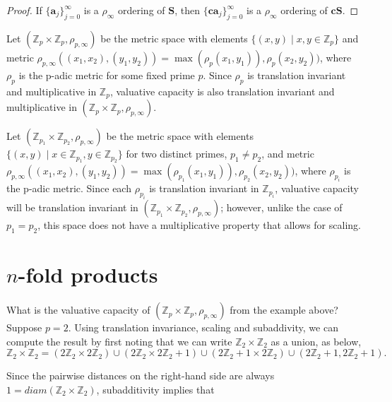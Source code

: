 \begin{proof}
If $\{\textbf{a}_j\}_{j=0}^\infty$ is a $\rho_\infty$ ordering of $\textbf{S}$, then $\{\textbf{ca}_j\}_{j=0}^\infty$ is a $\rho_\infty$ ordering of $\textbf{cS}$.
\end{proof}


\begin{example}
	Let $(\mathbb{Z}_p \times \mathbb{Z}_p, \rho_{p,\infty})$ be the metric space with elements $\{(x,y)\mid x,y \in \mathbb{Z}_p\}$ and metric $\rho_{p,\infty}((x_1,x_2), (y_1,y_2)) = \max(\rho_p(x_1, y_1)), \rho_p(x_2, y_2))$, where $\rho_p$ is the p-adic metric for some fixed prime $p$. Since $\rho_p$ is translation invariant and multiplicative in $\mathbb{Z}_p$, valuative capacity is also translation invariant and multiplicative in  $(\mathbb{Z}_p \times \mathbb{Z}_p, \rho_{p,\infty})$.
\end{example}

\begin{example}
	Let $(\mathbb{Z}_{p_1} \times \mathbb{Z}_{p_2}, \rho_{p,\infty})$ be the metric space with elements $\{(x,y)\mid x \in \mathbb{Z}_{p_1}, y \in \mathbb{Z}_{p_2}\}$ for two distinct primes, $p_1 \neq p_2$, and metric $\rho_{p,\infty}((x_1,x_2), (y_1,y_2)) = \max(\rho_{p_1}(x_1, y_1)), \rho_{p_2}(x_2, y_2))$, where $\rho_{p_i}$ is the p-adic metric. Since each $\rho_{p_i}$ is translation invariant in $\mathbb{Z}_{p_i}$, valuative capacity will be translation invariant  in  $(\mathbb{Z}_{p_1} \times \mathbb{Z}_{p_2}, \rho_{p,\infty})$; however, unlike the case of $p_1=p_2$, this space does not have a multiplicative property that allows for scaling.
\end{example}


\section*{ \textbf{$n$-fold products}}
What is the valuative capacity of  $(\mathbb{Z}_p \times \mathbb{Z}_p, \rho_{p,\infty})$  from the example above? Suppose $p=2$.  Using translation invariance, scaling and subaddivity, we can compute the result by first noting that we can write $\mathbb{Z}_2 \times \mathbb{Z}_2$ as a union, as below,
\[
\mathbb{Z}_2 \times \mathbb{Z}_2 = (2\mathbb{Z}_2 \times 2\mathbb{Z}_2) \cup (2\mathbb{Z}_2 \times 2\mathbb{Z}_2 +1) \cup (2\mathbb{Z}_2+1 \times 2\mathbb{Z}_2) \cup (2\mathbb{Z}_2+1, 2\mathbb{Z}_2+1).
\]

Since the pairwise distances on the right-hand side are always $1 = diam(\mathbb{Z}_2 \times \mathbb{Z}_2)$, subadditivity implies that 

